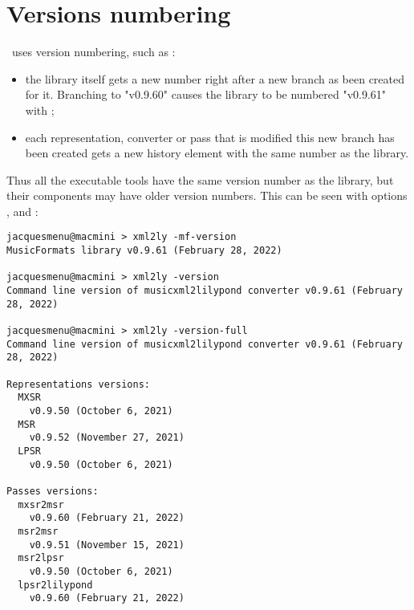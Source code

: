 
\chapter{Versions numbering}\label{Versions numbering}

\mf\ uses  version numbering, such as :%
\begin{itemize}
\item the library itself gets a new number right after a new branch as been created for it. Branching to "v0.9.60" causes the library to be numbered "v0.9.61" with ;

\item each representation, converter or pass that is modified this new branch has been created gets a new history element with the same number as the library.
\end{itemize}

Thus all the executable tools have the same version number as the library, but their components may have older version numbers. This can be seen with options ,  and  :
\begin{lstlisting}[language=Terminal]%%%JMI do this again
jacquesmenu@macmini > xml2ly -mf-version
MusicFormats library v0.9.61 (February 28, 2022)

jacquesmenu@macmini > xml2ly -version
Command line version of musicxml2lilypond converter v0.9.61 (February 28, 2022)

jacquesmenu@macmini > xml2ly -version-full
Command line version of musicxml2lilypond converter v0.9.61 (February 28, 2022)

Representations versions:
  MXSR                
    v0.9.50 (October 6, 2021)
  MSR                 
    v0.9.52 (November 27, 2021)
  LPSR                
    v0.9.50 (October 6, 2021)

Passes versions:
  mxsr2msr            
    v0.9.60 (February 21, 2022)
  msr2msr             
    v0.9.51 (November 15, 2021)
  msr2lpsr            
    v0.9.50 (October 6, 2021)
  lpsr2lilypond       
    v0.9.60 (February 21, 2022)
\end{lstlisting}
